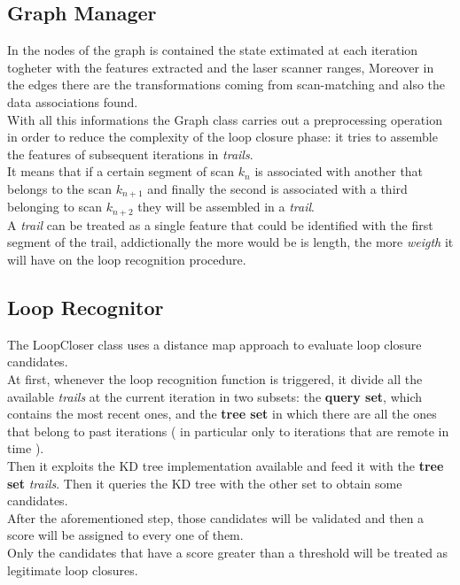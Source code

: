 \subsection{ Graph Manager}
In the nodes of the graph is contained the state extimated at each
iteration togheter with the features extracted and the laser scanner ranges,
Moreover in the edges there are the transformations coming from scan-matching
and also the data associations found.\\
With all this informations the Graph class carries out a preprocessing
operation in order to reduce the complexity of the loop closure phase:
it tries to assemble the features of subsequent iterations in \textsl{trails}.\\
It means that if a certain segment of scan $k_n$ is associated with another 
that belongs to the scan $k_{n+1}$ and finally the second is associated with a third
belonging to scan $k_{n+2}$ they will be assembled in a \textsl{trail}.\\
A \textsl{trail} can be treated as a single feature that could be identified
with the first segment of the trail, addictionally the more would be is length,
the more \textsl{weigth} it will have on the loop recognition procedure.

\subsection{ Loop Recognitor}
The LoopCloser class uses a distance map approach to evaluate loop closure
candidates.\\At first, whenever the loop recognition function is triggered,
it divide all the available \textsl{trails} at the current iteration in two
subsets: the \textbf{query set}, which contains the most recent ones, and the 
\textbf{tree set} in which there are all the ones that belong to past 
iterations ( in particular only to iterations that are remote in time ).\\
Then it exploits the KD tree implementation available and feed it with
the \textbf{tree set} \textsl{trails}. Then it queries the KD tree with the
other set to obtain some candidates.\\
After the aforementioned step, those candidates will be validated and then a score will be 
assigned to every one of them.\\Only the candidates that have a score greater
than a threshold will be treated as legitimate loop closures.




